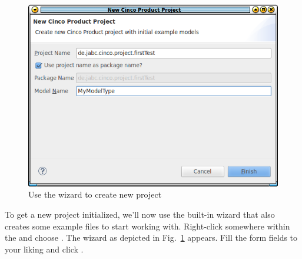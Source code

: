 \documentclass[a4paper,american,12pt]{scrreprt}
\begin{document}
\begin{figure}
	\centering
	\includegraphics[width=.5\textwidth]{screenshots/new-cp-wizard.png}
	\caption{Use the wizard to create new project}
	\label{fig:cpWizard}
\end{figure}

To get a new  project initialized, we'll now use the
built-in wizard that also creates some example files to start working with.
Right-click somewhere within the  and choose . The wizard as depicted in Fig.~\ref{fig:cpWizard} appears. Fill the
form fields to your liking and click .
\end{document}
